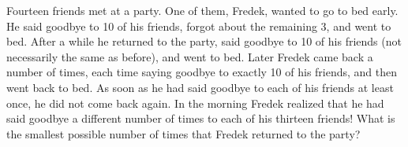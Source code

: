 Fourteen friends met at a party. One of them, Fredek, wanted to go to bed early. He said goodbye to 10 of his friends, forgot about the remaining 3, and went to bed. After a while he returned to the party, said goodbye to 10 of his friends (not necessarily the same as before), and went to bed. Later Fredek came back a number of times, each time saying goodbye to exactly 10 of his friends, and then went back to bed. As soon as he had said goodbye to each of his friends at least once, he did not come back again. In the morning Fredek realized that he had said goodbye a different number of times to each of his thirteen friends! What is the smallest possible number of times that Fredek returned to the party?